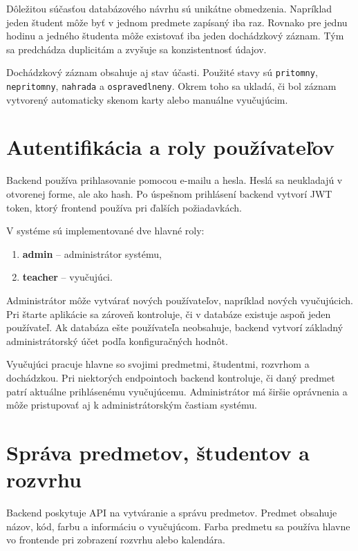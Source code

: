 Dôležitou súčasťou databázového návrhu sú unikátne obmedzenia. Napríklad jeden študent môže byť v jednom predmete zapísaný iba raz. Rovnako pre jednu hodinu a jedného študenta môže existovať iba jeden dochádzkový záznam. Tým sa predchádza duplicitám a zvyšuje sa konzistentnosť údajov.

Dochádzkový záznam obsahuje aj stav účasti. Použité stavy sú \texttt{pritomny}, \texttt{nepritomny}, \texttt{nahrada} a \texttt{ospravedlneny}. Okrem toho sa ukladá, či bol záznam vytvorený automaticky skenom karty alebo manuálne vyučujúcim.

\section{Autentifikácia a roly používateľov}
\label{sec:backend-authentication}

Backend používa prihlasovanie pomocou e-mailu a hesla. Heslá sa neukladajú v otvorenej forme, ale ako hash. Po úspešnom prihlásení backend vytvorí JWT token, ktorý frontend používa pri ďalších požiadavkách.

V systéme sú implementované dve hlavné roly:
\begin{enumerate}
    \item \textbf{admin} -- administrátor systému,
    \item \textbf{teacher} -- vyučujúci.
\end{enumerate}

Administrátor môže vytvárať nových používateľov, napríklad nových vyučujúcich. Pri štarte aplikácie sa zároveň kontroluje, či v databáze existuje aspoň jeden používateľ. Ak databáza ešte používateľa neobsahuje, backend vytvorí základný administrátorský účet podľa konfiguračných hodnôt.

Vyučujúci pracuje hlavne so svojimi predmetmi, študentmi, rozvrhom a dochádzkou. Pri niektorých endpointoch backend kontroluje, či daný predmet patrí aktuálne prihlásenému vyučujúcemu. Administrátor má širšie oprávnenia a môže pristupovať aj k administrátorským častiam systému.

\section{Správa predmetov, študentov a rozvrhu}
\label{sec:backend-subjects-schedule}

Backend poskytuje API na vytváranie a správu predmetov. Predmet obsahuje názov, kód, farbu a informáciu o vyučujúcom. Farba predmetu sa používa hlavne vo frontende pri zobrazení rozvrhu alebo kalendára.

